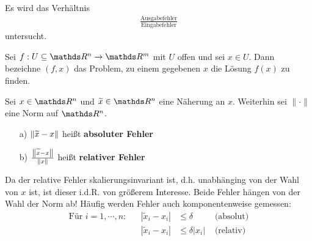  \label{3.2}
Es wird das Verhältnis 
\begin{gather*}
  \frac{\text{Ausgabefehler}}{\text{Eingabefehler}}
\end{gather*}
untersucht.

\begin{Defe}
  \label{3.2.1} 
  Sei $f: U \subseteq \R^n \rightarrow \R^m$ mit $U$ offen und sei $x\in U$.
  Dann bezeichne $(f, x)$ das Problem, zu einem gegebenen $x$ die Lösung $f(x)$ zu finden.
\end{Defe}

\begin{Defe}
  \label{3.2.2} 
  Sei $x\in\R^n$ und $\widetilde{x} \in \R^n$ eine Näherung an $x$. Weiterhin sei $\|\cdot\|$ eine Norm auf $\R^n$.
  \begin{itemize}
  \item[a)] $\left\| \widetilde{x} - x \right\|$ heißt \textbf{absoluter Fehler} 
  \item[b)] $\frac{\left\| \widetilde{x} - x \right\|}{\left\| x \right\|}$ heißt \textbf{relativer Fehler}
  \end{itemize}
  Da der relative Fehler skalierungsinvariant ist, d.h. unabhänging von der  Wahl von $x$ ist, ist dieser i.d.R. von größerem Interesse.
  Beide Fehler hängen von der Wahl der Norm ab!
  Häufig werden Fehler auch komponentenweise gemessen:
  \begin{align*}
    \text{Für } i=1,\cdots , n : && |\widetilde{x}_i - x_i | & \leq \delta & \text{ (absolut)} \\
                                 && |\widetilde{x}_i - x_i | &\leq \delta |x_i| & \text{ (relativ)}
  \end{align*}
\end{Defe}

